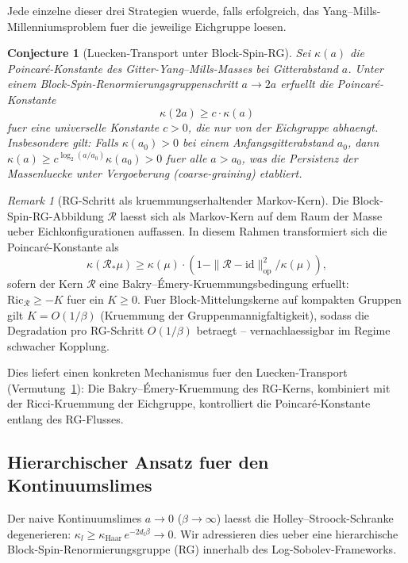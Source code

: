 \documentclass[12pt,a4paper]{article}
\theoremstyle{definition}
\theoremstyle{plain}
\newtheorem{conjecture}[definition]{Conjecture}
\theoremstyle{remark}
\newtheorem{remark}[definition]{Remark}
\begin{document}
Jede einzelne dieser drei Strategien wuerde, falls erfolgreich, das
Yang--Mills-Millenniumsproblem fuer die jeweilige Eichgruppe loesen.

\begin{conjecture}[Luecken-Transport unter Block-Spin-RG]
\label{conj:gap-transport}
Sei $\kappa(a)$ die Poincar\'e-Konstante des Gitter-Yang--Mills-Masses bei Gitterabstand $a$. Unter einem Block-Spin-Renormierungsgruppenschritt $a \to 2a$ erfuellt die Poincar\'e-Konstante
\[
\kappa(2a) \geq c \cdot \kappa(a)
\]
fuer eine universelle Konstante $c > 0$, die nur von der Eichgruppe abhaengt. Insbesondere gilt: Falls $\kappa(a_0) > 0$ bei einem Anfangsgitterabstand $a_0$, dann $\kappa(a) \geq c^{\log_2(a/a_0)} \kappa(a_0) > 0$ fuer alle $a > a_0$, was die Persistenz der Massenluecke unter Vergoeberung (coarse-graining) etabliert.
\end{conjecture}

\begin{remark}[RG-Schritt als kruemmungserhaltender Markov-Kern]
\label{rem:rg-markov-kernel}
Die Block-Spin-RG-Abbildung $\mathcal{R}$ laesst sich als Markov-Kern auf dem Raum der Masse ueber Eichkonfigurationen auffassen. In diesem Rahmen transformiert sich die Poincar\'e-Konstante als
\[
\kappa(\mathcal{R}_* \mu) \geq \kappa(\mu) \cdot \left(1 - \|\mathcal{R} - \mathrm{id}\|_{\mathrm{op}}^2 / \kappa(\mu) \right),
\]
sofern der Kern $\mathcal{R}$ eine Bakry--\'Emery-Kruemmungsbedingung erfuellt: $\mathrm{Ric}_{\mathcal{R}} \geq -K$ fuer ein $K \geq 0$. Fuer Block-Mittelungskerne auf kompakten Gruppen gilt $K = O(1/\beta)$ (Kruemmung der Gruppenmannigfaltigkeit), sodass die Degradation pro RG-Schritt $O(1/\beta)$ betraegt -- vernachlaessigbar im Regime schwacher Kopplung.

Dies liefert einen konkreten Mechanismus fuer den Luecken-Transport (Vermutung~\ref{conj:gap-transport}): Die Bakry--\'Emery-Kruemmung des RG-Kerns, kombiniert mit der Ricci-Kruemmung der Eichgruppe, kontrolliert die Poincar\'e-Konstante entlang des RG-Flusses.
\end{remark}

\subsection{Hierarchischer Ansatz fuer den Kontinuumslimes}
\label{sec:hierarchical-continuum}

Der naive Kontinuumslimes $a \to 0$ ($\beta \to \infty$) laesst die Holley--Stroock-Schranke degenerieren: $\kappa_l \geq \kappa_{\mathrm{Haar}}\, e^{-2d_l\beta} \to 0$. Wir adressieren dies ueber eine hierarchische Block-Spin-Renormierungsgruppe (RG) innerhalb des Log-Sobolev-Frameworks.
\end{document}
